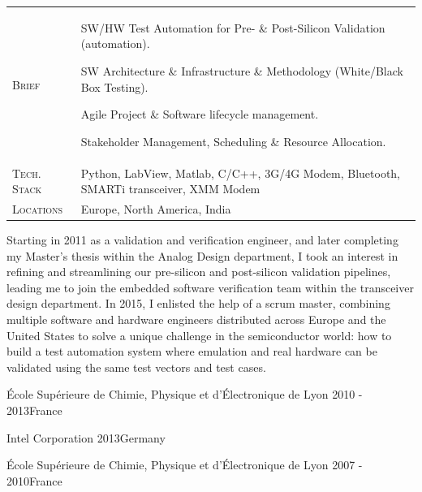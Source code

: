 \documentclass[10pt,a4paper]{moderncv}
\begin{document}
  \begin{tabularx}{\textwidth}{>{\scshape}l@{\hskip 3.5mm}L}
    Brief & SW/HW Test Automation for Pre- \& Post-Silicon Validation (automation).
    \par SW Architecture \& Infrastructure \& Methodology (White/Black Box Testing).
    \par Agile Project \& Software lifecycle management. 
    \par Stakeholder Management, Scheduling \& Resource Allocation.\\
    Tech. Stack & Python, LabView, Matlab, C/C++, 3G/4G Modem, Bluetooth, SMARTi transceiver, XMM Modem\\
    Locations & Europe, North America, India\\
  \end{tabularx}

  \vspace{1.5em}
  
  \begin{minipage}{\textwidth}
    \small
    Starting in 2011 as a validation and verification engineer, and later completing my Master's thesis within the Analog Design department, I took an interest in refining and streamlining our pre-silicon and post-silicon validation pipelines, leading me to join the embedded software verification team within the transceiver design department. In 2015, I enlisted the help of a scrum master, combining multiple software and hardware engineers distributed across Europe and the United States to solve a unique challenge in the semiconductor world: how to build a test automation system where emulation and real hardware can be validated using the same test vectors and test cases.
  \end{minipage}
    

    {École Supérieure de Chimie, Physique et d'Électronique de Lyon}
    {2010 - 2013}{France}

    {Intel Corporation}
    {2013}{Germany}

    {École Supérieure de Chimie, Physique et d'Électronique de Lyon}
    {2007 - 2010}{France}

    \clearpage
{}
\end{document}
